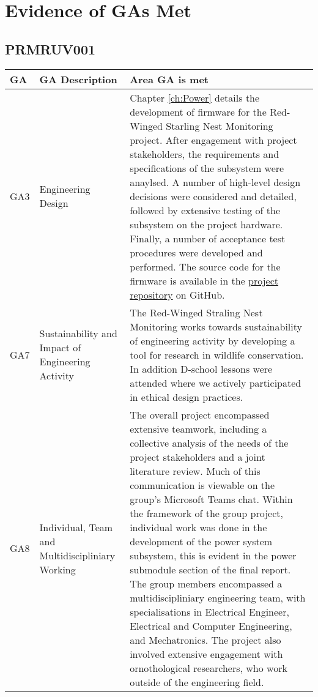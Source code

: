 \documentclass[class=report,11pt,crop=false]{standalone}
\begin{document}
\ifstandalone
\tableofcontents
\fi


\chapter{Evidence of GAs Met}

\section{PRMRUV001}

\centering
\begin{tabularx}{\textwidth}{|p{} p{} X|}

    \hline
    \textbf{GA} & \textbf{GA Description} & \textbf{Area GA is met} \\ \hline

    GA3 & Engineering Design & Chapter \ref{ch:Power} details the development of firmware for the Red-Winged Starling Nest Monitoring project. After engagement with project stakeholders, the requirements and specifications of the subsystem were anaylsed. A number of high-level design decisions were considered and detailed, followed by extensive testing of the subsystem on the project hardware. Finally, a number of acceptance test procedures were developed and performed. The source code for the firmware is available in the \href{https://github.com/rothdu/EEE4113F-Group13-2024}{project repository} on GitHub. \\ \hline

    GA7 & Sustainability and Impact of Engineering Activity & The Red-Winged Straling Nest Monitoring works towards sustainability of engineering activity by developing a tool for research in wildlife conservation. In addition D-school lessons were attended where we actively participated in ethical design practices. \\ \hline

    GA8 & Individual, Team and Multidiscipliniary Working & The overall project encompassed extensive teamwork, including a collective analysis of the needs of the project stakeholders and a joint literature review. Much of this communication is viewable on the group's Microsoft Teams chat. Within the framework of the group project, individual work was done in the development of the power system subsystem, this is evident in the power submodule section of the final report. The group members encompassed a multidiscipliniary engineering team, with specialisations in Electrical Engineer, Electrical and Computer Engineering, and Mechatronics. The project also involved extensive engagement with ornothological researchers, who work outside of the engineering field. \\ \hline


\end{tabularx}
\end{document}
